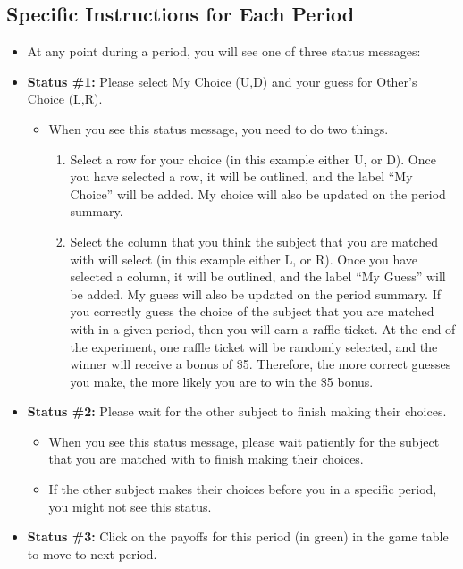 \documentclass[11pt]{article}
\newcommand{\dblbkt}[1]{}
\begin{document}
\subsection*{\dblbkt{2} Specific Instructions for Each Period} 
\begin{itemize} 
\item At any point during a period, you will see one of three status messages:
\item {\bf Status \#1:} Please select My Choice (U,D) and your guess for Other's Choice (L,R).
\begin{itemize} 
\item When you see this status message, you need to do two things. 
\begin{enumerate} 
\item Select a row for your choice (in this example either U, or D).  \dblbkt{1} Once you have selected a row, it will be outlined, and the label ``My Choice'' will be added.  \dblbkt{1} My choice will also be updated on the period summary.
\item Select the column that you think the subject that you are matched with will select (in this example either L, or R). \dblbkt{1} Once you have selected a column, it will be outlined, and the label ``My Guess'' will be added.  \dblbkt{1} My guess will also be updated on the period summary.  If you correctly guess the choice of the subject that you are matched with in a given period, then you will earn a raffle ticket.  At the end of the experiment, one raffle ticket will be randomly selected, and the winner will receive a bonus of \$5.  Therefore, the more correct guesses you make, the more likely you are to win the \$5 bonus.
\end{enumerate} 
\end{itemize} 
\item \dblbkt{1} {\bf Status \#2:} Please wait for the other subject to finish making their choices.
\begin{itemize} 
\item When you see this status message, please wait patiently for the subject that you are matched with to finish making their choices. 
\item If the other subject makes their choices before you in a specific period, you might not see this status.
\end{itemize} 
\item \dblbkt{1} {\bf Status \#3:} Click on the payoffs for this period (in green) in the game table to move to next period.
\begin{itemize} 

\end{itemize}
\end{itemize}
\end{document}
